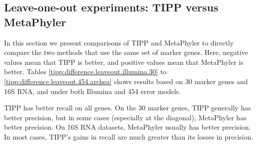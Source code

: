 
\subsection{Leave-one-out experiments: TIPP versus MetaPhyler}\label{supp:leave_one_out_tipp_meta_table}
In this section we present comparisons of TIPP and MetaPhyler to directly compare the two methods that use the same set of marker genes.
Here, negative values mean that TIPP is better, and positive values mean that MetaPhyler is better.
Tables \ref{tipp:difference.leaveout.illumina.30} to \ref{tipp:difference.leaveout.454.archea} shows results based on 30 marker genes and 16S RNA,
and under
both Illumina and 454 error models. 

TIPP has better recall on all genes.  On the 30 marker genes, TIPP generally  has better precision, but in some cases (especially at the diagonal), MetaPhyler has better precision. 
On 16S RNA datasets, MetaPhyler usually has better precision. In most cases, TIPP's gains in recall are much greater than its losses in precision. 


